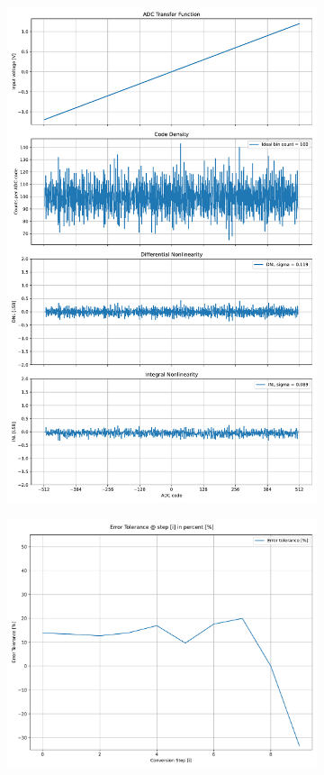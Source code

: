 \documentclass[varwidth]{standalone}
\begin{document}
\begin{figure}
\begin{subfigure}{0.32\textwidth}
    \includegraphics[width=\textwidth]{behavioral_10b_mismatch_radix175norm_nonlinearity.pdf}
\end{subfigure}
\begin{subfigure}{0.32\textwidth}
    \includegraphics[width=\textwidth]{behavioral_10b_mismatch_radix175norm_redundancy.pdf}

\end{subfigure}
\end{figure}
\end{document}
